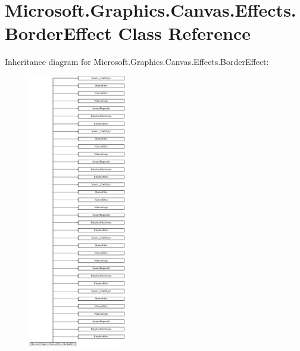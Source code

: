 \hypertarget{class_microsoft_1_1_graphics_1_1_canvas_1_1_effects_1_1_border_effect}{}\section{Microsoft.\+Graphics.\+Canvas.\+Effects.\+Border\+Effect Class Reference}
\label{class_microsoft_1_1_graphics_1_1_canvas_1_1_effects_1_1_border_effect}
Inheritance diagram for Microsoft.\+Graphics.\+Canvas.\+Effects.\+Border\+Effect\+:\begin{figure}[H]
\begin{center}
\leavevmode
\includegraphics[height=12.000000cm]{class_microsoft_1_1_graphics_1_1_canvas_1_1_effects_1_1_border_effect}
\end{center}
\end{figure}
